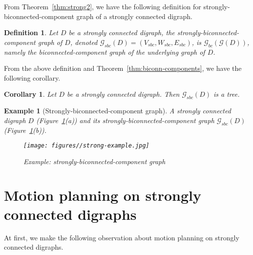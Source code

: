 \documentclass{article}
\newtheorem{cor}[thm]{Corollary}
\newtheorem{defn}[thm]{Definition}
\newtheorem{exmp}[thm]{Example}
\begin{document}
From Theorem~\ref{thm:strong2}, we have the following definition for
strongly-biconnected-component graph of a strongly connected
digraph.

\begin{defn}
Let $D$ be a strongly connected digraph, the
strongly-biconnected-component graph of $D$, denoted
$\mathcal{G}_{sbc}(D)=(V_{sbc},W_{sbc},E_{sbc})$, is
$\mathcal{G}_{bc}\left(\mathcal{G}(D)\right)$, namely the
biconnected-component graph of the underlying graph of $D$.
\end{defn}

From the above definition and Theorem~\ref{thm:biconn-components},
we have the following corollary.
\begin{cor}\label{cor:G_bis}
Let $D$ be a strongly connected digraph. Then $\mathcal{G}_{sbc}(D)$
is a tree.
\end{cor}

\begin{exmp}[Strongly-biconnected-component graph]
A strongly connected digraph $D$
(Figure~\ref{fig:strong-example}(a)) and its
strongly-biconnected-component graph $\mathcal{G}_{sbc}(D)$
(Figure~\ref{fig:strong-example}(b)).

\begin{figure}[ht]
\centering
  \texttt{[image: figures//strong-example.jpg]}
  \caption{Example: strongly-biconnected-component graph}\label{fig:strong-example}
\end{figure}
\end{exmp}



\section{Motion planning on strongly connected digraphs}\label{sec:strong-algo}

At first, we make the following observation about motion planning on
strongly connected digraphs.
\end{document}
